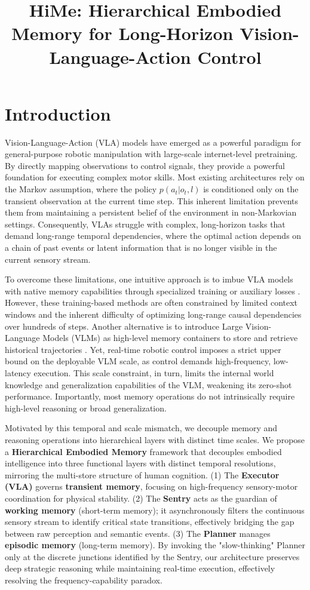 
\title{HiMe: Hierarchical Embodied Memory for Long-Horizon Vision-Language-Action Control}

\section{Introduction}
Vision-Language-Action (VLA) models have emerged as a powerful paradigm for general-purpose robotic manipulation with large-scale internet-level pretraining. By directly mapping observations to control signals, they provide a powerful foundation for executing complex motor skills. 
Most existing architectures rely on the Markov assumption, where the policy $p(a_t | o_t, l)$ is conditioned only on the transient observation at the current time step. This inherent limitation prevents them from maintaining a persistent belief of the environment in non-Markovian settings. 
Consequently, VLAs struggle with complex, long-horizon tasks that demand long-range temporal dependencies, where the optimal action depends on a chain of past events or latent information that is no longer visible in the current sensory stream.


To overcome these limitations, one intuitive approach is to imbue VLA models with native memory capabilities through specialized training or auxiliary losses \cite{torne2025, fang2025}. However, these training-based methods are often constrained by limited context windows and the inherent difficulty of optimizing long-range causal dependencies over hundreds of steps. Another alternative is to introduce Large Vision-Language Models (VLMs) as high-level memory containers to store and retrieve historical trajectories \cite{memer2025}. Yet, real-time robotic control imposes a strict upper bound on the deployable VLM scale, as control demands high-frequency, low-latency execution. This scale constraint, in turn, limits the internal world knowledge and generalization capabilities of the VLM, weakening its zero-shot performance. Importantly, most memory operations do not intrinsically require high-level reasoning or broad generalization. 

Motivated by this temporal and scale mismatch, we decouple memory and reasoning operations into hierarchical layers with distinct time scales.
We propose a \textbf{Hierarchical Embodied Memory} framework that decouples embodied intelligence into three functional layers with distinct temporal resolutions, mirroring the multi-store structure of human cognition. 
(1) The \textbf{Executor (VLA)} governs \textbf{transient memory}, focusing on high-frequency sensory-motor coordination for physical stability. 
(2) The \textbf{Sentry} acts as the guardian of \textbf{working memory} (short-term memory); it asynchronously filters the continuous sensory stream to identify critical state transitions, effectively bridging the gap between raw perception and semantic events. 
(3) The \textbf{Planner} manages \textbf{episodic memory} (long-term memory). 
By invoking the "slow-thinking" Planner only at the discrete junctions identified by the Sentry, our architecture preserves deep strategic reasoning while maintaining real-time execution, effectively resolving the frequency-capability paradox.


